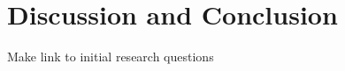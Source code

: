 \documentclass[../thesis.tex]{subfiles}
\begin{document}
\chapter{Discussion and Conclusion}\label{chp:Discussion}
Make link to initial research questions
\end{document}
